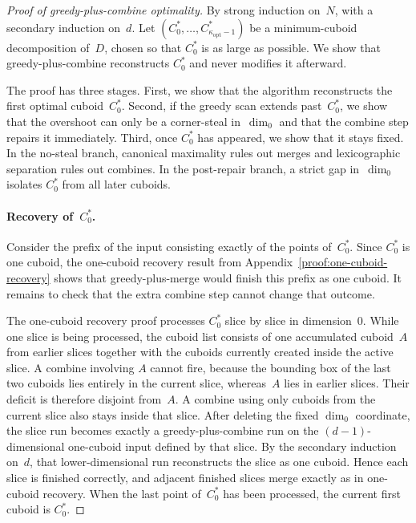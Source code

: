 \documentclass[manuscript,screen,review]{acmart}
\theoremstyle{definition}
\theoremstyle{plain}
\begin{document}
\begin{proof}[Proof of greedy-plus-combine optimality]
By strong induction on~$N$, with a secondary induction on~$d$.
Let $(C^*_0, \ldots, C^*_{\kappa_{\text{opt}}-1})$ be a
minimum-cuboid decomposition of~$D$, chosen so that $C^*_0$ is as
large as possible. We show that greedy-plus-combine reconstructs
$C^*_0$ and never modifies it afterward.

The proof has three stages. First, we show that the algorithm
reconstructs the first optimal cuboid~$C^*_0$. Second, if the greedy
scan extends past~$C^*_0$, we show that the overshoot can only be a
corner-steal in~$\dim_0$ and that the combine step repairs it
immediately. Third, once $C^*_0$ has appeared, we show that it stays
fixed. In the no-steal branch, canonical maximality rules out merges
and lexicographic separation rules out combines. In the post-repair
branch, a strict gap in~$\dim_0$ isolates $C^*_0$ from all later
cuboids.

\paragraph{Recovery of~$C^*_0$.}
Consider the prefix of the input consisting exactly of the points
of~$C^*_0$. Since $C^*_0$ is one cuboid, the one-cuboid recovery
result from Appendix~\ref{proof:one-cuboid-recovery} shows that
greedy-plus-merge would finish this prefix as one cuboid. It remains
to check that the extra combine step cannot change that outcome.

The one-cuboid recovery proof processes $C^*_0$ slice by slice in
dimension~0. While one slice is being processed, the cuboid list
consists of one accumulated cuboid~$A$ from earlier slices together
with the cuboids currently created inside the active slice. A combine
involving $A$ cannot fire, because the bounding box of the last two
cuboids lies entirely in the current slice, whereas~$A$ lies in
earlier slices. Their deficit is therefore disjoint from~$A$. A
combine using only cuboids from the current slice also stays inside
that slice. After deleting the fixed $\dim_0$ coordinate, the slice
run becomes exactly a greedy-plus-combine run on the
$(d{-}1)$-dimensional one-cuboid input defined by that slice. By the
secondary induction on~$d$, that lower-dimensional run reconstructs
the slice as one cuboid. Hence each slice is finished correctly, and
adjacent finished slices merge exactly as in one-cuboid recovery. When
the last point of~$C^*_0$ has been processed, the current first cuboid
is $C^*_0$.


\end{proof}
\end{document}
